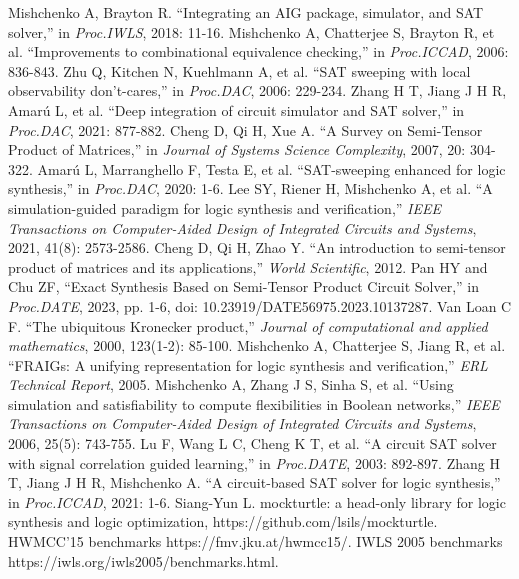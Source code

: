 \documentclass[conference]{IEEEtran}
\begin{document}
\footnotesize
\begin{thebibliography}{00}
     Mishchenko A, Brayton R. ``Integrating an AIG package, simulator, and SAT solver,'' in \emph{Proc.IWLS}, 2018: 11-16.
     Mishchenko A, Chatterjee S, Brayton R, et al. ``Improvements to combinational equivalence checking,'' in \emph{Proc.ICCAD}, 2006: 836-843.
     Zhu Q, Kitchen N, Kuehlmann A, et al. ``SAT sweeping with local observability don't-cares,'' in \emph{Proc.DAC}, 2006: 229-234.
     Zhang H T, Jiang J H R, Amarú L, et al. ``Deep integration of circuit simulator and SAT solver,'' in \emph{Proc.DAC}, 2021: 877-882.
     Cheng D, Qi H, Xue A. ``A Survey on Semi-Tensor Product of Matrices,'' in \emph{Journal of Systems Science Complexity}, 2007, 20: 304-322.
     Amarú L, Marranghello F, Testa E, et al. ``SAT-sweeping enhanced for logic synthesis,'' in \emph{Proc.DAC}, 2020: 1-6.
     Lee SY, Riener H, Mishchenko A, et al. ``A simulation-guided paradigm for logic synthesis and verification,'' \emph{IEEE Transactions on Computer-Aided Design of Integrated Circuits and Systems}, 2021, 41(8): 2573-2586.
     Cheng D, Qi H, Zhao Y. ``An introduction to semi-tensor product of matrices and its applications,'' \emph{World Scientific}, 2012.
     Pan HY and Chu ZF, ``Exact Synthesis Based on Semi-Tensor Product Circuit Solver,'' in \emph{Proc.DATE}, 2023, pp. 1-6, doi: 10.23919/DATE56975.2023.10137287.
     Van Loan C F. ``The ubiquitous Kronecker product,'' \emph{Journal of computational and applied mathematics}, 2000, 123(1-2): 85-100.
     Mishchenko A, Chatterjee S, Jiang R, et al. ``FRAIGs: A unifying representation for logic synthesis and verification,'' \emph{ERL Technical Report}, 2005.
     Mishchenko A, Zhang J S, Sinha S, et al. ``Using simulation and satisfiability to compute flexibilities in Boolean networks,'' \emph{IEEE Transactions on Computer-Aided Design of Integrated Circuits and Systems}, 2006, 25(5): 743-755.
     Lu F, Wang L C, Cheng K T, et al. ``A circuit SAT solver with signal correlation guided learning,'' in \emph{Proc.DATE}, 2003: 892-897.
     Zhang H T, Jiang J H R, Mishchenko A. ``A circuit-based SAT solver for logic synthesis,'' in \emph{Proc.ICCAD}, 2021: 1-6.
     Siang-Yun  L. mockturtle: a head-only library for logic synthesis and logic optimization, https://github.com/lsils/mockturtle.
     HWMCC'15 benchmarks https://fmv.jku.at/hwmcc15/.
     IWLS 2005 benchmarks https://iwls.org/iwls2005/benchmarks.html.
\end{thebibliography}
\end{document}
